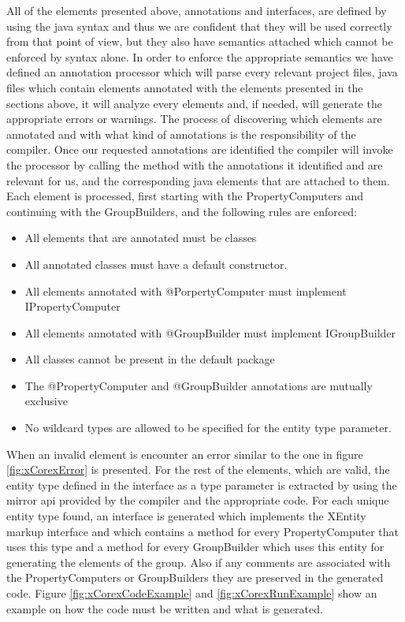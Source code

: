 	All of the elements presented above, annotations and interfaces, are defined 
by using the java syntax and thus we are confident that they will be used
correctly from that point of view, but they also have semantics attached which
cannot be enforced by syntax alone. In order to enforce the appropriate
semantics we have defined an annotation processor which will parse every
relevant project files, java files which contain elements annotated with the
elements presented in the sections above, it will analyze every elements and, if
needed, will generate the appropriate  errors or warnings.
	The process of discovering which elements are annotated and with what kind of
annotations is the responsibility of the compiler. Once our requested
annotations are identified the compiler will invoke the processor by calling
the 
method with the annotations it identified and are relevant for us, and the
corresponding java elements that are attached to them. 
	Each element is processed, first starting with the PropertyComputers and
continuing with the GroupBuilders, and the following rules are enforced:
	
	\begin{itemize}
	  \item All elements that are annotated must be classes
	  \item All annotated classes must have a default constructor.
	  \item All elements annotated with @PorpertyComputer must implement
 IPropertyComputer
 	  \item All elements annotated with @GroupBuilder must implement
 IGroupBuilder
 	  \item  All classes cannot be present in the default package
 	  \item  The @PropertyComputer and @GroupBuilder annotations are mutually
exclusive
	  \item  No wildcard types are allowed to be specified for the entity type
 parameter.
	\end{itemize}
	When an invalid element is encounter an error similar to the one in figure
\ref{fig:xCorexError} is presented.
	For the rest of the elements, which are valid, the entity type defined in the
interface as a type parameter is extracted by using the mirror api provided by
the compiler and the appropriate code. For each unique entity type found, an
interface is generated which implements the XEntity markup interface and which
contains a method for every PropertyComputer that uses this type and a method
for every GroupBuilder which uses this entity for generating the elements of the
group. Also if any comments are associated with the PropertyComputers or
GroupBuilders they are preserved in the generated code. Figure
\ref{fig:xCorexCodeExample} and \ref{fig:xCorexRunExample} show an example on
how the code must be written and what is generated.

